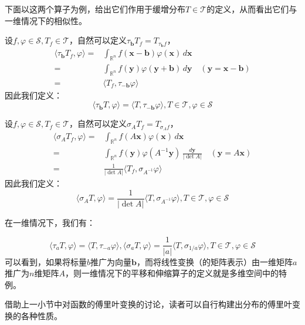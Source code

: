 \documentclass{ctexbook}
\begin{document}
下面以这两个算子为例，给出它们作用于缓增分布$T\in\mathcal{T} $的定义，从而看出它们与一维情况下的相似性。
\begin{example}[平移算子]
    设$f,\varphi\in\mathcal{S} ,T_f\in\mathcal{T} $，自然可以定义$\tau_{\mathbf{b}} T_f=T_{\tau_{\mathbf{b}} f}$，
    \begin{align*}
        \langle \tau_{\mathbf{b}} T_f,\varphi\rangle=&\int_{\mathbb{R}^n}f(\mathbf{x}-\mathbf{b})\varphi(\mathbf{x})\,d\mathbf{x}\\
        =&\int_{\mathbb{R}^n}f(\mathbf{y})\varphi(\mathbf{y}+\mathbf{b})\,d\mathbf{y}\quad (\mathbf{y}=\mathbf{x}-\mathbf{b})\\
        =&\langle T_f,\tau_{-\mathbf{b}}\varphi\rangle
    \end{align*}
    因此我们定义：
    \[\langle \tau_{\mathbf{b}} T,\varphi\rangle=\langle T,\tau_{-\mathbf{b}}\varphi\rangle,T\in\mathcal{T} ,\varphi\in\mathcal{S} \]
\end{example}

\begin{example}[伸缩算子]
    设$f,\varphi\in\mathcal{S} ,T_f\in\mathcal{T} $，自然可以定义$\sigma_A T_f=T_{\sigma_A f}$，
    \begin{align*}
        \langle \sigma_A T_f,\varphi\rangle=&\int_{\mathbb{R}^n}f(A\mathbf{x})\varphi(\mathbf{x})\,d\mathbf{x}\\
        =&\int_{\mathbb{R}^n}f(\mathbf{y})\varphi(A^{-1}\mathbf{y})\,\frac{d\mathbf{y}}{|\det A|}\quad (\mathbf{y}=A\mathbf{x})\\
        =&\frac{1}{|\det A|}\langle T_f,\sigma_{A^{-1}}\varphi\rangle
    \end{align*}
    因此我们定义：
    \[\langle \sigma_A T,\varphi\rangle=\frac{1}{|\det A|}\langle T,\sigma_{A^{-1}}\varphi\rangle,T\in\mathcal{T} ,\varphi\in\mathcal{S} \]
\end{example}
在一维情况下，我们有：

\[\langle \tau_a T,\varphi\rangle=\langle T,\tau_{-a}\varphi\rangle,\langle\sigma_{a} T,\varphi\rangle=\frac{1}{|a|}\langle T,\sigma_{1/a}\varphi\rangle,T\in\mathcal{T} ,\varphi\in\mathcal{S} \]
可以看到，如果将标量$b$推广为向量$\mathbf{b}$，而将线性变换（的矩阵表示）由一维矩阵$a$推广为$n$维矩阵$A$，则一维情况下的平移和伸缩算子的定义就是多维空间中的特例。

借助上一小节中对函数的傅里叶变换的讨论，读者可以自行构建出分布的傅里叶变换的各种性质。
\end{document}
